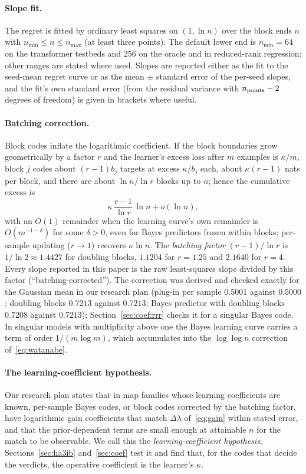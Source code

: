 \documentclass[11pt,a4paper]{article}
\begin{document}
\paragraph{Slope fit.} The regret is fitted by ordinary least squares on $(1,\ln n)$ over the block ends $n$ with $n_{\min}\le n\le n_{\max}$ (at least three points). The default lower end is $n_{\min}=64$ on the transformer testbeds and 256 on the oracle and in reduced-rank regression; other ranges are stated where used. Slopes are reported either as the fit to the seed-mean regret curve or as the mean $\pm$ standard error of the per-seed slopes, and the fit's own standard error (from the residual variance with $n_{\rm points}-2$ degrees of freedom) is given in brackets where useful.

\paragraph{Batching correction.} Block codes inflate the logarithmic coefficient. If the block boundaries grow geometrically by a factor $r$ and the learner's excess loss after $m$ examples is $\kappa/m$, block $j$ codes about $(r-1)b_j$ targets at excess $\kappa/b_j$ each, about $\kappa(r-1)$ nats per block, and there are about $\ln n/\ln r$ blocks up to $n$; hence the cumulative excess is
\begin{equation}
\kappa\,\frac{r-1}{\ln r}\,\ln n+o(\ln n),
\label{eq:batching}
\end{equation}
with an $O(1)$ remainder when the learning curve's own remainder is $O(m^{-1-\delta})$ for some $\delta>0$, even for Bayes predictors frozen within blocks; per-sample updating ($r\to1$) recovers $\kappa\ln n$. The \emph{batching factor} $(r-1)/\ln r$ is $1/\ln2\approx1.4427$ for doubling blocks, $1.1204$ for $r=1.25$ and $2.1640$ for $r=4$. Every slope reported in this paper is the raw least-squares slope divided by this factor (``batching-corrected''). The correction was derived and checked exactly for the Gaussian mean in our research plan (plug-in per sample $0.5001$ against $0.5000$; doubling blocks $0.7213$ against $0.7213$; Bayes predictor with doubling blocks $0.7208$ against $0.7213$); Section~\ref{sec:coef:rrr} checks it for a singular Bayes code. In singular models with multiplicity above one the Bayes learning curve carries a term of order $1/(m\log m)$, which accumulates into the $\log\log n$ correction of~\eqref{eq:watanabe}.

\paragraph{The learning-coefficient hypothesis.} Our research plan states that in map families whose learning coefficients are known, per-sample Bayes codes, or block codes corrected by the batching factor, have logarithmic gain coefficients that match $\Delta\lambda$ of~\eqref{eq:gain} within stated error, and that the prior-dependent terms are small enough at attainable $n$ for the match to be observable. We call this the \emph{learning-coefficient hypothesis}; Sections~\ref{sec:ha3ib} and~\ref{sec:coef} test it and find that, for the codes that decide the verdicts, the operative coefficient is the learner's $\kappa$.
\end{document}
